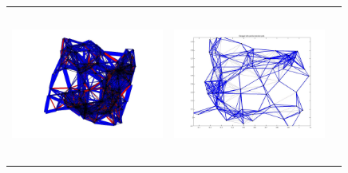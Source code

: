 \begin{tabular}{ |c|c|c| }
\includegraphics[width=5.0cm,height=5.0cm]{images/RandomGraphOptimalEdgeWithedgeWeight_FastMixingMarkovChain.jpg}      &
\includegraphics[width=5.0cm,height=5.0cm]{images/RandomGraphOptimalEdgeWithedgeWeight_PositiveTransitionProbs_FastMixingMarkovChain.jpg}
\end{tabular}

